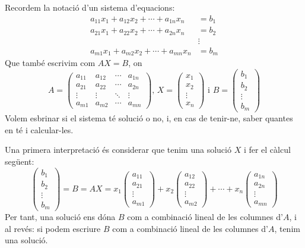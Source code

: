 \documentclass[
  11pt,
]{book}
\numberwithin{dummy}{section}
\theoremstyle{maincolornumbox}
\theoremstyle{blacknumex}
\theoremstyle{blacknumbox}
\theoremstyle{maincolornum}
\begin{document}
Recordem la notació d'un sistema d'equacions: \begin{align*}
a_{11}x_1+a_{12}x_2+ \cdots + a_{1n}x_n &= b_1 \\
a_{21}x_1+a_{22}x_2+ \cdots + a_{2n}x_n &= b_2 \\
&\vdots \\
a_{m1}x_1+a_{m2}x_2+ \cdots + a_{mn}x_n &= b_m
\end{align*} Que també escrivim com \(AX=B\), on \[A=
\begin{pmatrix}
a_{11} & a_{12} & \cdots & a_{1n} \\
a_{21} & a_{22} & \cdots & a_{2n} \\
\vdots & \vdots & \ddots & \vdots \\
a_{m1} & a_{m2} & \cdots & a_{mn} 
\end{pmatrix}\text{, }
X=
\begin{pmatrix}
x_1 \\ x_2 \\ \vdots \\ x_n
\end{pmatrix} \text{ i }
B=
\begin{pmatrix}
b_1 \\ b_2 \\ \vdots \\ b_m
\end{pmatrix}\] Volem esbrinar si el sistema té solució o no, i, en cas
de tenir-ne, saber quantes en té i calcular-les.

Una primera interpretació és considerar que tenim una solució \(X\) i fer
el càlcul següent: \[\begin{pmatrix}
b_1 \\ b_2 \\ \vdots \\ b_m
\end{pmatrix} = B = AX =
x_1 \begin{pmatrix}
a_{11} \\ a_{21} \\ \vdots \\ a_{m1}
\end{pmatrix} +
x_2 \begin{pmatrix}
a_{12} \\ a_{22} \\ \vdots \\ a_{m2}
\end{pmatrix} + \cdots +
x_n \begin{pmatrix}
a_{1n} \\ a_{2n} \\ \vdots \\ a_{mn}
\end{pmatrix}\] Per tant, una solució ens dóna \(B\) com a combinació
lineal de les columnes d'\(A\), i al revés: si podem escriure \(B\) com a
combinació lineal de les columnes d'\(A\), tenim una solució.
\end{document}

